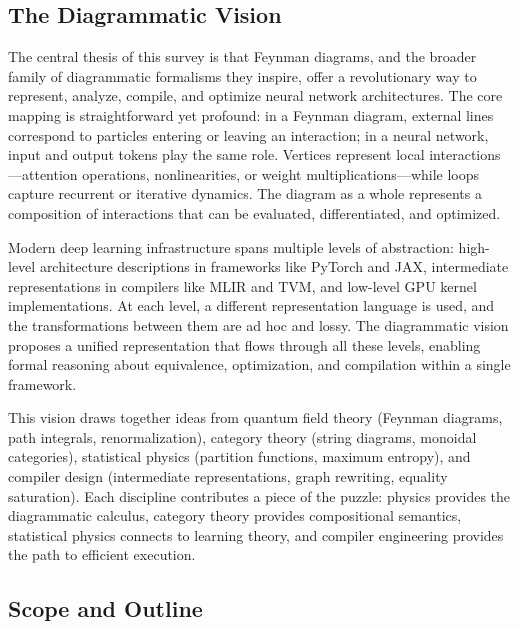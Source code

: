 \documentclass[12pt,a4paper]{article}
\begin{document}
\subsection{The Diagrammatic Vision}

The central thesis of this survey is that Feynman diagrams, and the broader family of diagrammatic formalisms they inspire, offer a revolutionary way to represent, analyze, compile, and optimize neural network architectures. The core mapping is straightforward yet profound: in a Feynman diagram, external lines correspond to particles entering or leaving an interaction; in a neural network, input and output tokens play the same role. Vertices represent local interactions---attention operations, nonlinearities, or weight multiplications---while loops capture recurrent or iterative dynamics. The diagram as a whole represents a composition of interactions that can be evaluated, differentiated, and optimized.

Modern deep learning infrastructure spans multiple levels of abstraction: high-level architecture descriptions in frameworks like PyTorch and JAX, intermediate representations in compilers like MLIR and TVM, and low-level GPU kernel implementations. At each level, a different representation language is used, and the transformations between them are ad hoc and lossy. The diagrammatic vision proposes a unified representation that flows through all these levels, enabling formal reasoning about equivalence, optimization, and compilation within a single framework.

This vision draws together ideas from quantum field theory (Feynman diagrams, path integrals, renormalization), category theory (string diagrams, monoidal categories), statistical physics (partition functions, maximum entropy), and compiler design (intermediate representations, graph rewriting, equality saturation). Each discipline contributes a piece of the puzzle: physics provides the diagrammatic calculus, category theory provides compositional semantics, statistical physics connects to learning theory, and compiler engineering provides the path to efficient execution.

\subsection{Scope and Outline}
\end{document}
